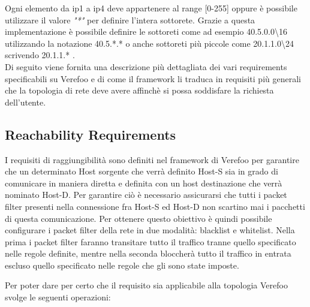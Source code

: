 Ogni elemento da ip1 a ip4 deve appartenere al range [0-255] oppure è possibile utilizzare il valore \textit{"*"} per definire l'intera sottorete.
Grazie a questa implementazione è possibile definire le sottoreti come ad esempio 40.5.0.0\textbackslash16 utilizzando la notazione 40.5.*.* o anche sottoreti
più piccole come 20.1.1.0\textbackslash24 scrivendo 20.1.1.* . \\

Di seguito viene fornita una descrizione più dettagliata dei vari requirements specificabili su Verefoo e di come il framework li traduca in requisiti più generali che la topologia
di rete deve avere affinchè si possa soddisfare la richiesta dell'utente.

\subsection{Reachability Requirements}

I requisiti di raggiungibilità sono definiti nel framework di Verefoo per garantire che un determinato Host sorgente che verrà definito Host-S sia 
in grado di comunicare in maniera diretta e definita con un host destinazione che verrà nominato Host-D. Per garantire ciò è necessario assicurarsi che tutti i 
packet filter presenti nella connessione fra Host-S ed Host-D non scartino mai i pacchetti di questa comunicazione. Per ottenere questo obiettivo è quindi possibile
configurare i packet filter della rete in due modalità: blacklist e whitelist. Nella prima i packet filter faranno transitare tutto il traffico tranne quello specificato
nelle regole definite, mentre nella seconda bloccherà tutto il traffico in entrata escluso quello specificato nelle regole che gli sono state imposte.

Per poter dare per certo che il requisito sia applicabile alla topologia Verefoo svolge le seguenti operazioni:

